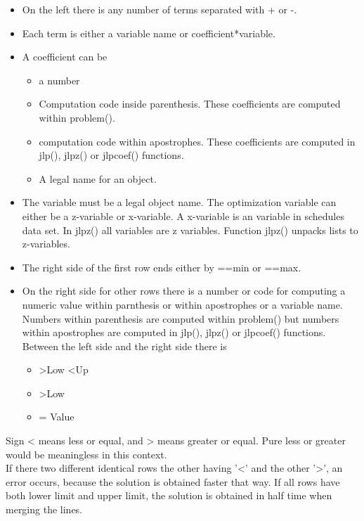 \begin{itemize}
\item On the left there is any number of terms separated with + or -.
\item Each term is either a variable name or coefficient*variable.
\item A coefficient can be
\begin {itemize}
\item a number
\item Computation code inside parenthesis. These coefficients are computed within \textcolor{VioletRed}{problem}().
\item computation code within apostrophes. These coefficients are computed in \textcolor{VioletRed}{jlp}(), \textcolor{VioletRed}{jlpz}() or \textcolor{VioletRed}{jlpcoef}() functions.
\item  A legal name for an object.
\end{itemize}
\item The variable must be a legal object name.
The optimization variable can either be a z-variable or x-variable.
A x-variable is an variable in schedules data set.
In \textcolor{VioletRed}{jlpz}() all variables are z variables. Function \textcolor{VioletRed}{jlpz}() unpacks lists to z-variables.
\item The right side of the first row ends either by ==min or ==max.
\item On the right side for other rows there is a number or code for computing a numeric value
within parnthesis or within apostrophes or a variable name. Numbers within parenthesis are
computed within \textcolor{VioletRed}{problem}() but numbers within apostrophes are computed in \textcolor{VioletRed}{jlp}(), \textcolor{VioletRed}{jlpz}() or \textcolor{VioletRed}{jlpcoef}() functions.
Between the left side and the right side there is\\
\begin{itemize}
\item  >Low <Up
\item >Low
\item = Value
\end{itemize}
\end{itemize}

Sign < means less or equal, and > means greater or equal. Pure less or greater would be meaningless in this context.\\
If there two different identical rows
the other having '<' and the other '>', an error occurs, because the solution is obtained faster that way.
If all rows have both lower limit and upper limit, the solution is obtained in half time
when merging the lines.

